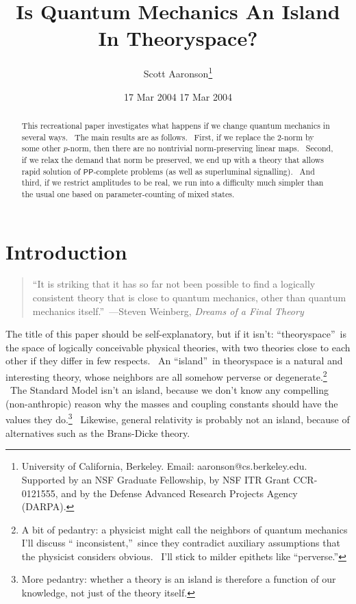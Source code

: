 \documentclass[12pt]{article}%
\date{17 Mar 2004 }
\begin{document}
\title{\large Is Quantum Mechanics An Island In Theoryspace?}
\author{\normalsize Scott Aaronson\thanks{University of California, Berkeley. Email:
aaronson@cs.berkeley.edu. Supported by an NSF Graduate Fellowship, by NSF ITR
Grant CCR-0121555, and by the Defense Advanced Research Projects Agency (DARPA).}}
\date{\normalsize 17 Mar 2004}

\maketitle
\begin{abstract}
This recreational paper investigates what happens if we change quantum
mechanics in several ways. \ The main results are as follows. \ First, if we
replace the $2$-norm by some other $p$-norm, then there are no nontrivial
norm-preserving linear maps. \ Second, if we relax the demand that norm be
preserved, we end up with a theory that allows rapid solution of $\mathsf{PP}%
$-complete problems (as well as superluminal signalling). \ And third, if we
restrict amplitudes to be real, we run into a difficulty much simpler than the
usual one based on parameter-counting of mixed states.

\end{abstract}

\section{Introduction\label{INTRO}}

\begin{quote}
``It is striking that it has so far not been possible to find a logically
consistent theory that is close to quantum mechanics, other than quantum
mechanics itself.''\ ---Steven Weinberg, \textit{Dreams of a Final Theory} \cite{weinberg2}
\end{quote}

The title of this paper should be self-explanatory, but if it isn't:
\textquotedblleft theoryspace\textquotedblright\ is the space of logically
conceivable physical theories, with two theories close to each other if they
differ in few respects. \ An \textquotedblleft island\textquotedblright\ in
theoryspace is a natural and interesting theory, whose neighbors are all
somehow perverse or degenerate.\footnote{A bit of pedantry: a physicist might
call the neighbors of quantum mechanics I'll discuss \textquotedblleft
inconsistent,\textquotedblright\ since they contradict auxiliary assumptions
that the physicist considers obvious. \ I'll stick to milder epithets like
\textquotedblleft perverse.\textquotedblright} \ The Standard Model isn't an
island, because we don't know any compelling (non-anthropic) reason why the
masses and coupling constants should have the values they do.\footnote{More
pedantry: whether a theory is an island is therefore a function of our
knowledge, not just of the theory itself.} \ Likewise, general relativity is
probably not an island, because of alternatives such as the Brans-Dicke theory.
\end{document}
